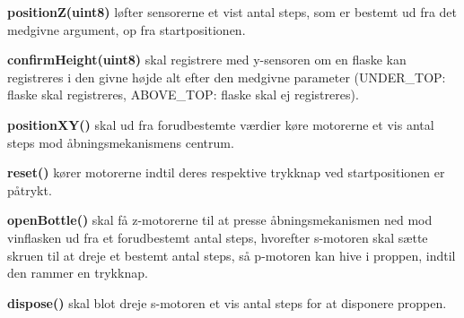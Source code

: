 \textbf{positionZ(uint8)} løfter sensorerne et vist antal steps, som er bestemt ud fra det medgivne argument, op fra startpositionen.

\textbf{confirmHeight(uint8)} skal registrere med y-sensoren om en flaske kan registreres i den givne højde alt efter den medgivne parameter (UNDER\_TOP: flaske skal registreres, ABOVE\_TOP: flaske skal ej registreres).

\textbf{positionXY()} skal ud fra forudbestemte værdier køre motorerne et vis antal steps mod åbningsmekanismens centrum.

\textbf{reset()} kører motorerne indtil deres  respektive trykknap ved startpositionen er påtrykt.

\textbf{openBottle()} skal få z-motorerne til at presse åbningsmekanismen ned mod vinflasken ud fra et forudbestemt antal steps, hvorefter s-motoren skal sætte skruen til at dreje et bestemt antal steps, så p-motoren kan hive i proppen, indtil den rammer en trykknap.

\textbf{dispose()} skal blot dreje s-motoren et vis antal steps for at disponere proppen.